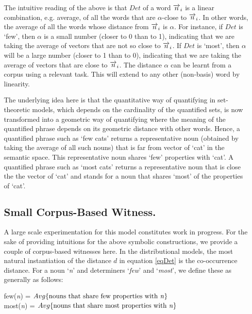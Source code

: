 \noindent
The intuitive reading of the above is that $Det$ of a word $\overrightarrow{n}_i$ is a linear combination, e.g.  average,  of all the words that are $\alpha$-close to $\overrightarrow{n}_i$. In other words, the average of all the words  whose distance from $\overrightarrow{n}_i$ is $\alpha$.  For instance, if $Det$ is `few', then $\alpha$ is a small number (closer to 0 than to 1), indicating that we are taking the average of vectors that are not so close to $\overrightarrow{n}_i$. If $Det$ is `most', then $\alpha$ will be a large number (closer to 1 than to 0), indicating that we are taking the average of vectors that are close to $\overrightarrow{n}_i$. The distance $\alpha$ can be learnt from a corpus using a relevant task. This will extend to any other (non-basis) word by linearity.  

The underlying idea here is that the quantitative way of quantifying in set-theoretic models, which depends on the cardinality of the quantified sets, is now transformed into a geometric way of quantifying where the meaning of the quantified phrase depends on its geometric distance with other words. Hence, a quantified phrase such as `few cats' returns a representative noun (obtained by taking the average of all such nouns) that is far from vector of  `cat'  in the semantic space. This representative noun shares `few' properties with `cat'. A quantified phrase such as `most cats' returns a representative noun that is close the the vector of `cat' and stands for a noun that shares `most' of the properties of `cat'. 

\subsection{Small Corpus-Based Witness.} 

A large scale experimentation  for this model constitutes work in progress.  For the sake of providing  intuitions for the above symbolic constructions, we provide a couple of corpus-based witnesses here. In the distributional models, the most natural instantiation of the distance $d$  in equation \ref{eqDet} is the  co-occurrence distance. For a noun `\emph{n}' and determiners `\emph{few}' and `\emph{most}', we  define these as generally as follows:

\begin{center}
few(\emph{n}) = $Avg\{\mbox{nouns that share  few properties with \emph{n}}\}$\\
most(\emph{n}) = $Avg\{\mbox{nouns that share most properties  with \emph{n}}\}$
\end{center}

